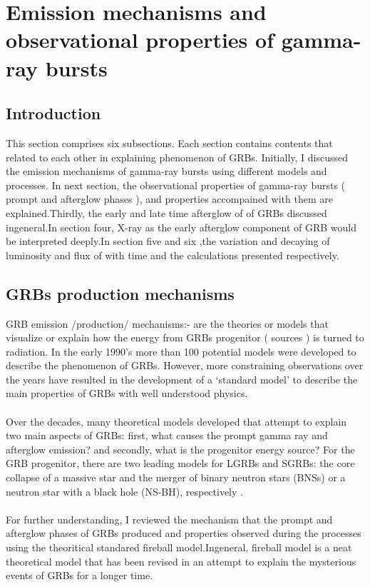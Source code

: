 
\setcounter{chapter}{1}
\chapter{ Emission mechanisms and observational properties of gamma-ray bursts}
\label{chap:2}
\section{Introduction}
This section comprises six subsections. Each section contains contents that related to each other in explaining  phenomenon of GRBs. Initially, I discussed the emission mechanisms of gamma-ray bursts using different models and processes. In next section, the observational properties  of gamma-ray bursts ( prompt and  afterglow phases ), and  properties accompained with them are explained.Thirdly, the early  and late time afterglow of of GRBs discussed ingeneral.In section four, X-ray as the early afterglow component of GRB would be interpreted deeply.In section five and six ,the variation and decaying of luminosity and flux of with time and the calculations presented respectively.    
\section{GRBs production mechanisms}
GRB emission  /production/ mechanisms:- are the theories or models that visualize or  explain  how the  energy from GRBs  progenitor ( sources ) is turned to radiation. In the early 1990’s   more than 100  potential  models  were  developed to describe the phenomenon of GRBs. However, more  constraining  observations  over  the  years have resulted in the  development of a ‘standard model’ to describe the main properties of GRBs with well understood  physics.\\\\
Over the decades, many theoretical models developed that attempt to explain two main aspects of GRBs: first, what causes the prompt gamma ray and afterglow emission? and secondly, what is the progenitor energy source? For the GRB progenitor, there are two leading models for LGRBs and SGRBs: the core collapse of a massive star and the merger of binary neutron stars (BNSs) or a neutron star with a black hole (NS-BH), respectively \citep {13}.\\\\ For further  understanding, I reviewed the mechanism   that the prompt and  afterglow  phases of GRBs produced  and  properties  observed during the processes  using  the  theoritical standared  fireball model.Ingeneral, fireball model is a neat theoretical model that has been revised in an attempt to explain  the mysterious events of GRBs for a longer  time.    
